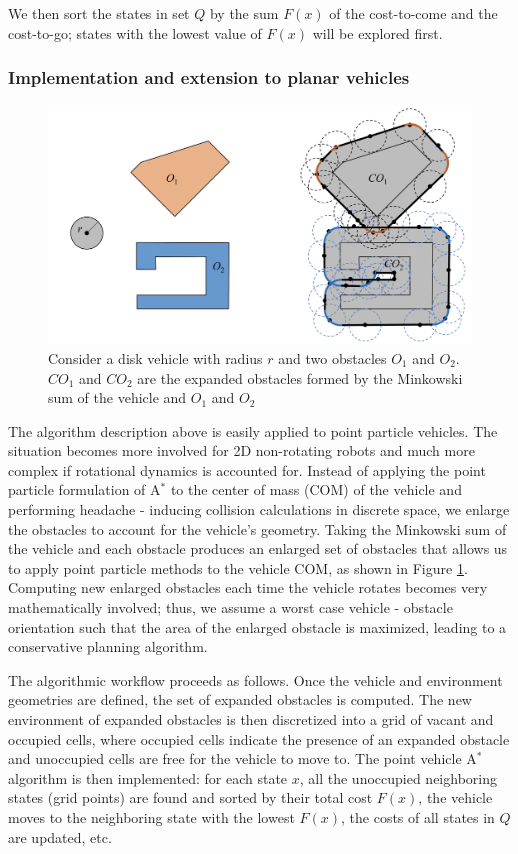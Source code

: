 \documentclass[10pt,letterpaper]{article}
\begin{document}
    We then sort the states in set $Q$ by the sum $F(x)$ of the cost-to-come and the cost-to-go; states with the lowest value of $F(x)$ will be explored first. 
    
    \subsubsection*{Implementation and extension to planar vehicles}
    
    \begin{figure}[!h]
        \centering
        \includegraphics[width= 10 cm]{figures/expanded_obs.png}
        \caption{Consider a disk vehicle with radius $r$ and two obstacles $O_1$ and $O_2$. $CO_1$ and $CO_2$ are the expanded obstacles formed by the Minkowski sum of the vehicle and $O_1$ and $O_2$}
        \label{fig: expand_obs}
    \end{figure}
    
    
    The algorithm description above is easily applied to point particle vehicles. The situation becomes more involved for 2D non-rotating robots and much more complex if rotational dynamics is accounted for. Instead of applying the point particle formulation of A$^*$ to the center of mass (COM) of the vehicle and performing headache - inducing collision calculations in discrete space, we enlarge the obstacles to account for the vehicle's geometry.  Taking the Minkowski sum of the vehicle and each obstacle produces an enlarged set of obstacles that allows us to apply point particle methods to the vehicle COM, as shown in Figure \ref{fig: expand_obs}. Computing new enlarged obstacles each time the vehicle rotates becomes very mathematically involved; thus, we assume a worst case vehicle - obstacle orientation such that the area of the enlarged obstacle is maximized, leading to a conservative planning algorithm.
    
    The algorithmic workflow proceeds as follows. Once the vehicle and environment geometries are defined, the set of expanded obstacles is computed. The new environment of expanded obstacles is then discretized into a grid of vacant and occupied cells, where occupied cells indicate the presence of an expanded obstacle and unoccupied cells are free for the vehicle to move to. The point vehicle A$^*$ algorithm is then implemented: for each state $x$, all the unoccupied neighboring states (grid points) are found and sorted by their total cost $F(x)$, the vehicle moves to the neighboring state with the lowest $F(x)$, the costs of all states in $Q$ are updated, etc.
    
\end{document}
